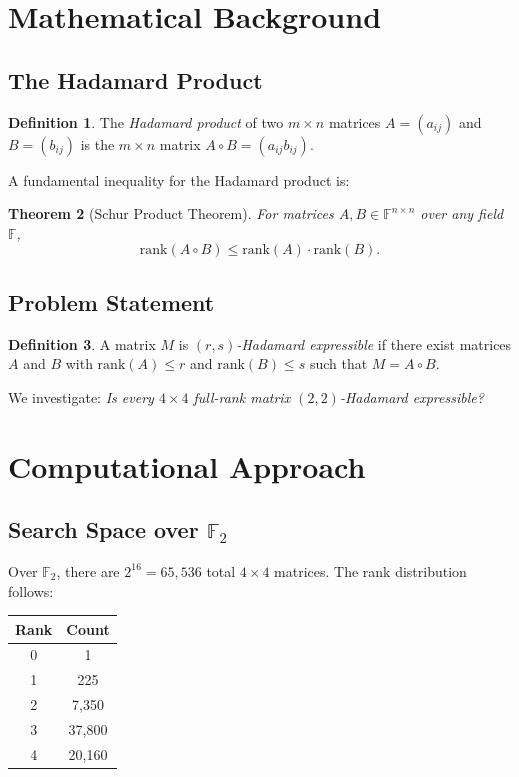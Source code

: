 \documentclass[11pt]{amsart}
\theoremstyle{plain}
\newtheorem{theorem}{Theorem}
\theoremstyle{definition}
\newtheorem{definition}[theorem]{Definition}
\theoremstyle{remark}
\begin{document}
\section{Mathematical Background}

\subsection{The Hadamard Product}

\begin{definition}
The \emph{Hadamard product} of two $m \times n$ matrices $A = (a_{ij})$ and $B = (b_{ij})$ is the $m \times n$ matrix $A \circ B = (a_{ij}b_{ij})$.
\end{definition}

A fundamental inequality for the Hadamard product is:

\begin{theorem}[Schur Product Theorem]
For matrices $A, B \in \mathbb{F}^{n \times n}$ over any field $\mathbb{F}$,
\[
\mathrm{rank}(A \circ B) \leq \mathrm{rank}(A) \cdot \mathrm{rank}(B).
\]
\end{theorem}

\subsection{Problem Statement}

\begin{definition}
A matrix $M$ is \emph{$(r,s)$-Hadamard expressible} if there exist matrices $A$ and $B$ with $\mathrm{rank}(A) \leq r$ and $\mathrm{rank}(B) \leq s$ such that $M = A \circ B$.
\end{definition}

We investigate: \emph{Is every $4 \times 4$ full-rank matrix $(2,2)$-Hadamard expressible?}

\section{Computational Approach}

\subsection{Search Space over $\mathbb{F}_2$}

Over $\mathbb{F}_2$, there are $2^{16} = 65,536$ total $4 \times 4$ matrices. The rank distribution follows:

\begin{center}
\begin{tabular}{cc}
\toprule
Rank & Count \\
\midrule
0 & 1 \\
1 & 225 \\
2 & 7,350 \\
3 & 37,800 \\
4 & 20,160 \\
\bottomrule
\end{tabular}
\end{center}
\end{document}
